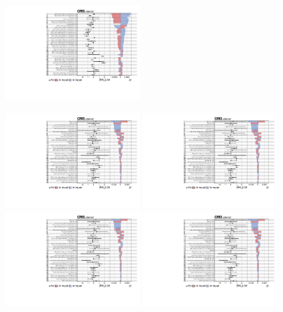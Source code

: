 \begin{figure}[htbp]
  \includegraphics[width=0.45\textwidth,page=6]{fig/fitValidation/impacts_WprToWH1000_6p_72.pdf}\\
  \caption{
  }
  \label{fig:impacts_WprToWH}
\end{figure}

\begin{figure}[htbp]
  \centering
  \includegraphics[width=0.45\textwidth,page=1]{fig/fitValidation/impacts_VBFRadToWW1000_6p_72.pdf}
  \includegraphics[width=0.45\textwidth,page=2]{fig/fitValidation/impacts_VBFRadToWW1000_6p_72.pdf}\\
  \includegraphics[width=0.45\textwidth,page=3]{fig/fitValidation/impacts_VBFRadToWW1000_6p_72.pdf}
  \includegraphics[width=0.45\textwidth,page=4]{fig/fitValidation/impacts_VBFRadToWW1000_6p_72.pdf}\\

\end{figure}
